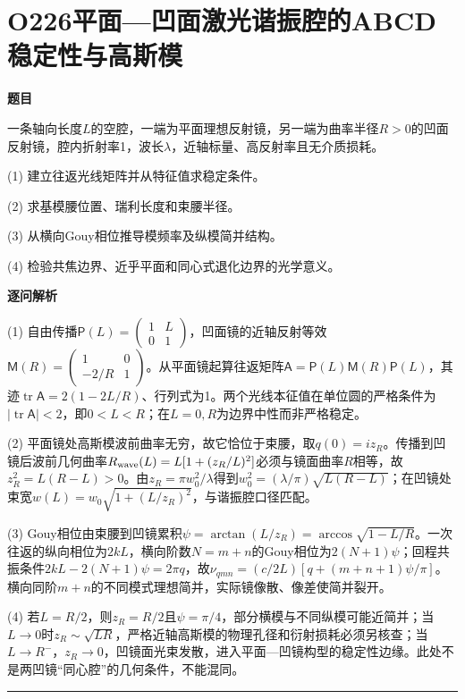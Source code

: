 \documentclass[UTF8,a4paper,11pt,oneside,openany]{ctexbook}
\begin{document}
\section*{O226\quad 平面—凹面激光谐振腔的ABCD稳定性与高斯模}
\textbf{题目}\par
一条轴向长度$L$的空腔，一端为平面理想反射镜，另一端为曲率半径$R>0$的凹面反射镜，腔内折射率1，波长$\lambda$，近轴标量、高反射率且无介质损耗。
\par\smallskip\noindent (1) 建立往返光线矩阵并从特征值求稳定条件。
\par\smallskip\noindent (2) 求基模腰位置、瑞利长度和束腰半径。
\par\smallskip\noindent (3) 从横向Gouy相位推导模频率及纵模简并结构。
\par\smallskip\noindent (4) 检验共焦边界、近乎平面和同心式退化边界的光学意义。
\par\medskip\textbf{逐问解析}\par
\par\smallskip\noindent (1) 自由传播$\mathsf P(L)=\begin{pmatrix}1&L\\0&1\end{pmatrix}$，凹面镜的近轴反射等效$\mathsf M(R)=\begin{pmatrix}1&0\\-2/R&1\end{pmatrix}$。从平面镜起算往返矩阵$\mathsf A=\mathsf P(L)\mathsf M(R)\mathsf P(L)$，其迹$\operatorname{tr}\mathsf A=2(1-2L/R)$、行列式为1。两个光线本征值在单位圆的严格条件为$|\operatorname{tr}\mathsf A|<2$，即$0<L<R$；在$L=0,R$为边界中性而非严格稳定。
\par\smallskip\noindent (2) 平面镜处高斯模波前曲率无穷，故它恰位于束腰，取$q(0)=iz_R$。传播到凹镜后波前几何曲率$R_{\rm wave}(L)=L[1+(z_R/L)^2]$必须与镜面曲率$R$相等，故$z_R^2=L(R-L)>0$。由$z_R=\pi w_0^2/\lambda$得到$w_0^2=(\lambda/\pi)\sqrt{L(R-L)}$；在凹镜处束宽$w(L)=w_0\sqrt{1+(L/z_R)^2}$，与谐振腔口径匹配。
\par\smallskip\noindent (3) Gouy相位由束腰到凹镜累积$\psi=\arctan(L/z_R)=\arccos\sqrt{1-L/R}$。一次往返的纵向相位为$2kL$，横向阶数$N=m+n$的Gouy相位为$2(N+1)\psi$；回程共振条件$2kL-2(N+1)\psi=2\pi q$，故$\nu_{qmn}=(c/2L)[q+(m+n+1)\psi/\pi]$。横向同阶$m+n$的不同模式理想简并，实际镜像散、像差使简并裂开。
\par\smallskip\noindent (4) 若$L=R/2$，则$z_R=R/2$且$\psi=\pi/4$，部分横模与不同纵模可能近简并；当$L\to0$时$z_R\sim\sqrt{LR}$，严格近轴高斯模的物理孔径和衍射损耗必须另核查；当$L\to R^-$，$z_R\to0$，凹镜面光束发散，进入平面—凹镜构型的稳定性边缘。此处不是两凹镜“同心腔”的几何条件，不能混同。
\par\medskip\hrule\medskip
\end{document}
